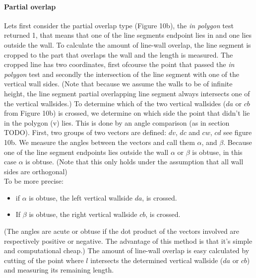 \documentclass[10pt]{article}
\begin{document}



	\paragraph{Partial overlap}
	Lets first consider the partial overlap type (Figure 10b), the \emph{in polygon} test
	returned 1, that means that one of the line segments endpoint lies in
	and one lies outside the wall.
	To calculate the amount of line-wall overlap, the line segment is cropped to the
	part that overlaps the wall and the length is measured. 
	The cropped line has two coordinates, first ofcourse the point that passed
	the \emph{in polygon} test and secondly the intersection of the line
	segment with one of the vertical wall sides.
	(Note that because we assume the walls to be of infinite height, the line
	segment partial overlapping line segment always intersects one of the
	vertical wallsides.)
	To determine which of the two vertical wallsides ($da$ or $cb$ from Figure 10b)
	 is crossed, we determine on which side the point that didn't lie in the polygon (v) lies.
	This is done by an angle comparison (as in section TODO).
	First, two groups of two vectors are defined: $dv$, $dc$ and $cw$, $cd$ see figure 10b.
	We measure the angles between the vectors and call them $\alpha$, and
	$\beta$. 
	Because one of the line segment endpoints lies outside
	the wall $\alpha$ or $\beta$ is obtuse, in this case $\alpha$ is obtuse.
	(Note that this only holds under the assumption that all wall sides are orthogonal)\\
	To be more precise: 
	\begin{itemize}
	\item if $\alpha$ is obtuse, the left vertical wallside $da$, is
	crossed. \\
	\item If $\beta$ is obtuse, the right vertical wallside $cb$, is
	crossed. \\
	\end{itemize}
	(The angles are acute or obtuse if the dot product of the vectors involved
	are respectively positive or negative. The advantage of this method is that
	it's simple and computational cheap.)
	The amount of line-wall overlap is easy calculated by cutting of the
	point where $l$ intersects the determined vertical wallside ($da$ or
	$cb$) and measuring its remaining length.
\end{document}

